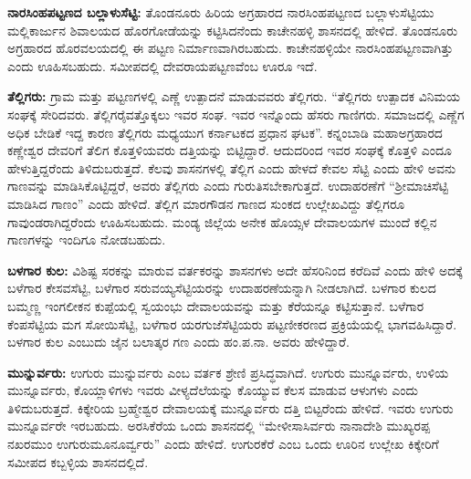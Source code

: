 \textbf{ನಾರಸಿಂಹಪಟ್ಟಣದ ಬಲ್ಲಾಳುಸೆಟ್ಟಿ: } ತೊಂಡನೂರು ಹಿರಿಯ ಅಗ್ರಹಾರದ ನಾರಸಿಂಹಪಟ್ಟಣದ ಬಲ್ಲಾಳುಸೆಟ್ಟಿಯು ಮಲ್ಲಿಕಾರ್ಜುನ ಶಿವಾಲಯದ ಹೊರಗೋಡೆಯನ್ನು ಕಟ್ಟಿಸಿದನೆಂದು ಕಾಚೇನಹಳ್ಳಿ ಶಾಸನದಲ್ಲಿ ಹೇಳಿದೆ. ತೊಂಡನೂರು ಅಗ್ರಹಾರದ ಹೊರವಲಯದಲ್ಲಿ ಈ ಪಟ್ಟಣ ನಿರ್ಮಾಣವಾಗಿರಬಹುದು. ಕಾಚೇನಹಳ್ಳಿಯೇ ನಾರಸಿಂಹಪಟ್ಟಣವಾಗಿತ್ತು ಎಂದು ಊಹಿಸಬಹುದು. ಸಮೀಪದಲ್ಲಿ ದೇವರಾಯಪಟ್ಟಣವೆಂಬ ಊರೂ ಇದೆ. 

\textbf{ತೆಲ್ಲಿಗರು: } ಗ್ರಾಮ ಮತ್ತು ಪಟ್ಟಣಗಳಲ್ಲಿ ಎಣ್ಣೆ ಉತ್ಪಾದನೆ ಮಾಡುವವರು ತೆಲ್ಲಿಗರು. “ತೆಲ್ಲಿಗರು ಉತ್ಪಾದಕ ವಿನಿಮಯ ಸಂಘಕ್ಕೆ ಸೇರಿದವರು. ತೆಲ್ಲಿಗರೈವತ್ತೊಕ್ಕಲು ಇವರ ಸಂಘ. ಇವರ ಇನ್ನೊಂದು ಹೆಸರು ಗಾಣಿಗರು. ಸಮಾಜದಲ್ಲಿ ಎಣ್ಣೆಗ ಅಧಿಕ ಬೇಡಿಕೆ ಇದ್ದ ಕಾರಣ ತೆಲ್ಲಿಗರು ಮಧ್ಯಯುಗ ಕರ್ನಾಟಕದ ಪ್ರಧಾನ ಘಟಕ”. ಕನ್ನಂಬಾಡಿ ಮಹಾಅಗ್ರಹಾರದ ಕಣ್ಣೇಶ್ವರ ದೇವರಿಗೆ ತೆಲಿಗ ಕೊತ್ತಳಿಯವರು ದತ್ತಿಯನ್ನು ಬಿಟ್ಟಿದ್ದಾರೆ. ಆದುದರಿಂದ ಇವರ ಸಂಘಕ್ಕೆ ಕೊತ್ತಳಿ ಎಂದೂ ಹೇಳುತ್ತಿದ್ದರೆಂದು ತಿಳಿದುಬರುತ್ತದೆ. ಕೆಲವು ಶಾಸನಗಳಲ್ಲಿ ತೆಲ್ಲಿಗ ಎಂದು ಹೇಳದೆ ಕೇವಲ ಸೆಟ್ಟಿ ಎಂದು ಹೇಳಿ ಅವನು ಗಾಣವನ್ನು ಮಾಡಿಸಿಕೊಟ್ಟಿದ್ದರೆ, ಅವರು ತೆಲ್ಲಿಗರು ಎಂದು ಗುರುತಿಸಬೇಕಾಗುತ್ತದೆ. ಉದಾಹರಣೆಗೆ “ಶ‍್ರೀಮಾಚಿಸೆಟ್ಟಿ ಮಾಡಿಸಿದ ಗಾಣಂ” ಎಂದು ಹೇಳಿದೆ.  ತೆಲ್ಲಿಗ ಮಾರಗೌಡನ ಗಾಣದ ಸುಂಕದ ಉಲ್ಲೇಖವಿದ್ದು ತೆಲ್ಲಿಗರೂ ಗಾವುಂಡರಾಗಿದ್ದರೆಂದು ಊಹಿಸಬಹುದು. ಮಂಡ್ಯ ಜಿಲ್ಲೆಯ ಅನೇಕ ಹೊಯ್ಸಳ ದೇವಾಲಯಗಳ ಮುಂದೆ ಕಲ್ಲಿನ ಗಾಣಗಳನ್ನು ಇಂದಿಗೂ ನೋಡಬಹುದು. 

\textbf{ಬಳಗಾರ ಕುಲ:} ವಿಶಿಷ್ಟ ಸರಕನ್ನು ಮಾರುವ ವರ್ತಕರನ್ನು ಶಾಸನಗಳು ಅದೇ ಹೆಸರಿನಿಂದ ಕರೆದಿವೆ ಎಂದು ಹೇಳಿ ಅದಕ್ಕೆ ಬಳೆಗಾರ ಕೇಸವಸೆಟ್ಟಿ, ಬಳೆಗಾರ ಸರುವಯ್ಯಸೆಟ್ಟಿಯರನ್ನು ಉದಾಹರಣೆಯನ್ನಾಗಿ ನೀಡಲಾಗಿದೆ. ಬಳಗಾರ ಕುಲದ ಬಮ್ಮಣ್ಣ ಇಂಗಲೀಕನ ಕುಪ್ಪೆಯಲ್ಲಿ ಸ್ವಯಂಭು ದೇವಾಲಯವನ್ನು ಮತ್ತು ಕೆರೆಯನ್ನೂ ಕಟ್ಟಿಸುತ್ತಾನೆ. ಬಳೆಗಾರ ಕೆಂಪಸೆಟ್ಟಿಯ ಮಗ ಸೋಯಿಸೆಟ್ಟಿ, ಬಳೆಗಾರ ಯರಗುಜೆಸೆಟ್ಟಿಯರು ಪಟ್ಟಣೀಕರಣದ ಪ್ರಕ್ರಿಯೆಯಲ್ಲಿ ಭಾಗವಹಿಸಿದ್ದಾರೆ. ಬಳಗಾರ ಕುಲ ಎಂಬುದು ಜೈನ ಬಲಾತ್ಕರ ಗಣ ಎಂದು ಹಂ.ಪ.ನಾ. ಅವರು ಹೇಳಿದ್ದಾರೆ.

\textbf{ಮುನ್ನುರ್ವರು: } ಉಗುರು ಮುನ್ನುರ್ವರು ಎಂಬ ವರ್ತಕ ಶ್ರೇಣಿ ಪ್ರಸಿದ್ಧವಾಗಿದೆ. ಉಗುರು ಮುನ್ನೂರ್ವರು, ಉಳಿಯ ಮುನ್ನೂರ್ವರು, ಕೊಯ್ಲಾಳಿಗಳು ಇವರು ವೀಳ್ಯದೆಲೆಯನ್ನು ಕೊಯ್ಯುವ ಕೆಲಸ ಮಾಡುವ ಆಳುಗಳು ಎಂದು ತಿಳಿದುಬರುತ್ತದೆ. ಕಿಕ್ಕೇರಿಯ ಬ್ರಹ್ಮೇಶ್ವರ ದೇವಾಲಯಕ್ಕೆ ಮುನ್ನೂರ್ವರು ದತ್ತಿ ಬಿಟ್ಟರೆಂದು ಹೇಳಿದೆ. ಇವರು ಉಗುರು ಮುನ್ನೂರ್ವರೇ ಇರಬಹುದು. ಅರಸಿಕೆರೆಯ ಒಂದು ಶಾಸನದಲ್ಲಿ “ಮೇಳೀಸಾಸಿರ್ವರು ನಾನಾದೇಶಿ ಮುಖ್ಯರಪ್ಪ ನಖರಮುಂ ಉಗುರುಮೂನೂರ್ವ್ವರು” ಎಂದು ಹೇಳಿದೆ. ಉಗುರಕೆರೆ ಎಂಬ ಒಂದು ಊರಿನ ಉಲ್ಲೇಖ ಕಿಕ್ಕೇರಿಗೆ ಸಮೀಪದ ಕಬ್ಬಳ್ಳಿಯ ಶಾಸನದಲ್ಲಿದೆ.

